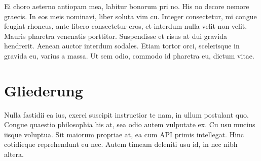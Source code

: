Ei choro aeterno antiopam mea, labitur bonorum pri no. His no decore nemore graecis. In eos meis nominavi, liber soluta vim cu. Integer consectetur, mi congue feugiat rhoncus, ante libero consectetur eros, et interdum nulla velit non velit. Mauris pharetra venenatis porttitor. Suspendisse et risus at dui gravida hendrerit. Aenean auctor interdum sodales. Etiam tortor orci, scelerisque in gravida eu, varius a massa. Ut sem odio, commodo id pharetra eu, dictum vitae. 

%
%
\section{Gliederung}
\label{sec:intro:structure}
Nulla fastidii ea ius, exerci suscipit instructior te nam, in ullum postulant quo. Congue quaestio philosophia his at, sea odio autem vulputate ex. Cu usu mucius iisque voluptua. Sit maiorum propriae at, ea cum \ac{API} primis intellegat. Hinc cotidieque reprehendunt eu nec. Autem timeam deleniti usu id, in nec nibh altera.
